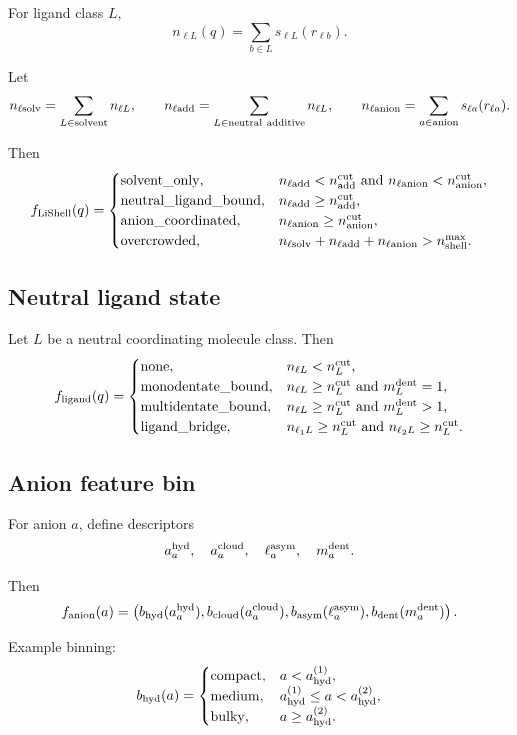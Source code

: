 For ligand class \(L\),
\[
n_{\ell L}(q)=\sum_{b\in L}s_{\ell L}(r_{\ell b}).
\]

Let
\[
n_{\ell{\rm solv}}=\sum_{L\in{\rm solvent}}n_{\ell L},
\qquad
n_{\ell{\rm add}}=\sum_{L\in{\rm neutral\ additive}}n_{\ell L},
\qquad
n_{\ell{\rm anion}}=\sum_{a\in{\rm anion}}s_{\ell a}(r_{\ell a}).
\]

Then
\[
f_{\rm LiShell}(q)=
\begin{cases}
{\rm solvent\_only}, & n_{\ell{\rm add}}<n_{\rm add}^{\rm cut}
\text{ and }n_{\ell{\rm anion}}<n_{\rm anion}^{\rm cut},\\
{\rm neutral\_ligand\_bound}, & n_{\ell{\rm add}}\ge n_{\rm add}^{\rm cut},\\
{\rm anion\_coordinated}, & n_{\ell{\rm anion}}\ge n_{\rm anion}^{\rm cut},\\
{\rm overcrowded}, & n_{\ell{\rm solv}}+n_{\ell{\rm add}}+n_{\ell{\rm anion}}
>n_{\rm shell}^{\max}.
\end{cases}
\]

\subsection{Neutral ligand state}

Let \(L\) be a neutral coordinating molecule class. Then
\[
f_{\rm ligand}(q)=
\begin{cases}
{\rm none}, & n_{\ell L}<n_L^{\rm cut},\\
{\rm monodentate\_bound}, & n_{\ell L}\ge n_L^{\rm cut}
\text{ and }m_L^{\rm dent}=1,\\
{\rm multidentate\_bound}, & n_{\ell L}\ge n_L^{\rm cut}
\text{ and }m_L^{\rm dent}>1,\\
{\rm ligand\_bridge}, &
n_{\ell_1 L}\ge n_L^{\rm cut}
\text{ and }n_{\ell_2 L}\ge n_L^{\rm cut}.
\end{cases}
\]

\subsection{Anion feature bin}

For anion \(a\), define descriptors
\[
a_a^{\rm hyd},\quad a_a^{\rm cloud},\quad \ell_a^{\rm asym},\quad m_a^{\rm dent}.
\]

Then
\[
f_{\rm anion}(a)=
\left(
b_{\rm hyd}(a_a^{\rm hyd}),
b_{\rm cloud}(a_a^{\rm cloud}),
b_{\rm asym}(\ell_a^{\rm asym}),
b_{\rm dent}(m_a^{\rm dent})
\right).
\]

Example binning:
\[
b_{\rm hyd}(a)=
\begin{cases}
{\rm compact}, & a<a_{\rm hyd}^{(1)},\\
{\rm medium}, & a_{\rm hyd}^{(1)}\le a<a_{\rm hyd}^{(2)},\\
{\rm bulky}, & a\ge a_{\rm hyd}^{(2)}.
\end{cases}
\]

